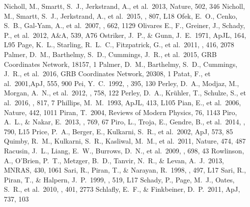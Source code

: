 \documentclass[traditabstract,longauth]{aa}
\begin{document}
\begin{thebibliography}{99}
 Nicholl, M., Smartt, S.~J., Jerkstrand, A., et al.\ 2013, Nature, 502, 346 
 Nicholl, M., Smartt, S.~J., Jerkstrand, A., et al.\ 2015, \apjl, 807, L18 
 Ofek, E.~O., Cenko, S.~B., Gal-Yam, A., et al.\ 2007, \apj, 662, 1129 
 Olivares E., F., Greiner, J., Schady, P., et al.\ 2012, A\&A, 539, A76
 Ostriker, J.~P., \& Gunn, J.~E.\ 1971, ApJL, 164, L95 
 Page, K.~L., Starling, R.~L.~C., Fitzpatrick, G., et al.\ 2011, \mnras, 416, 2078 
 Palmer, D.~M., Barthelmy, S.~D., Cummings, J.~R., et al.\ 2015, GRB Coordinates Network, 18157, 1 
 Palmer, D.~M., Barthelmy, S.~D., Cummings, J.~R., et al.\ 2016, GRB Coordinates Network, 20308, 1 
 Patat, F., et al.\ 2001,ApJ, 555, 900 
 Pei, Y.~C.\ 1992, \apj, 395, 130 
 Perley, D.~A., Modjaz, M., Morgan, A.~N., et al.\ 2012, \apj, 758, 122
 Perley, D.~A., Kr{\"u}hler, T., Schulze, S., et al.\ 2016, \apj, 817, 7 
 Phillips, M.~M.\ 1993, ApJL, 413, L105 
 Pian, E., et al.\ 2006, Nature, 442, 1011 
 Piran, T.\ 2004, Reviews of Modern Physics, 76, 1143 
 Piro, A.~L., \& Nakar, E.\ 2013, \apj, 769, 67 
 Piro, L., Troja, E., Gendre, B., et al.\ 2014, \apjl, 790, L15 
 Price, P.~A., Berger, E., Kulkarni, S.~R., et al.\ 2002, ApJ, 573, 85 
 Quimby, R.~M., Kulkarni, S.~R., Kasliwal, M.~M., et al.\ 2011, Nature, 474, 487
 Racusin, J.~L., Liang, E.~W., Burrows, D.~N., et al.\ 2009, \apj, 698, 43 
 Rowlinson, A., O'Brien, P.~T., Metzger, B.~D., Tanvir, N.~R., \& Levan, A.~J.\ 2013, MNRAS, 430, 1061 
 Sari, R., Piran, T., \& Narayan, R.\ 1998, \apjl, 497, L17 
 Sari, R., Piran, T., \& Halpern, J.~P.\ 1999, \apjl, 519, L17 
 Schady, P., Page, M.~J., Oates, S.~R., et al.\ 2010, \mnras, 401, 2773 
 Schlafly, E.~F., \& Finkbeiner, D.~P.\ 2011, ApJ, 737, 103 

\end{thebibliography}
\end{document}
